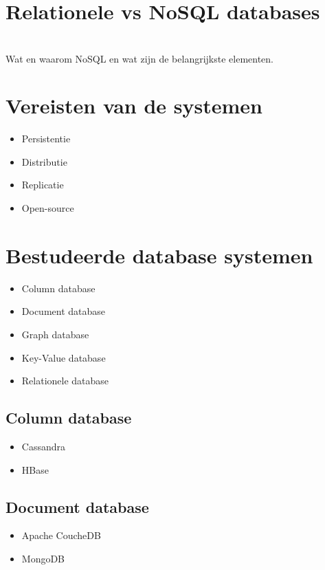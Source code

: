 \section{Relationele vs NoSQL databases} 

\section{}
Wat en waarom NoSQL en wat zijn de belangrijkste elementen.

\section{Vereisten van de systemen}
\begin{itemize}
\item Persistentie
\item Distributie
\item Replicatie
\item Open-source
\end{itemize}

\section{Bestudeerde database systemen}
\begin{itemize}
\item Column database
\item Document database
\item Graph database
\item Key-Value database
\item Relationele database
\end{itemize}

\subsection{Column database}
\begin{itemize}
\item Cassandra
\item HBase
\end{itemize}

\subsection{Document database}
\begin{itemize}
\item Apache CoucheDB
\item MongoDB
\end{itemize}

